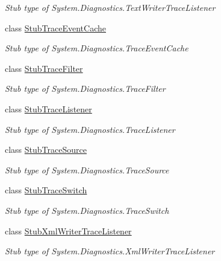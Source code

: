 \begin{DoxyCompactItemize}
\begin{DoxyCompactList}\small\item\em Stub type of System.\-Diagnostics.\-Text\-Writer\-Trace\-Listener\end{DoxyCompactList}\item 
class \hyperlink{class_system_1_1_diagnostics_1_1_fakes_1_1_stub_trace_event_cache}{Stub\-Trace\-Event\-Cache}
\begin{DoxyCompactList}\small\item\em Stub type of System.\-Diagnostics.\-Trace\-Event\-Cache\end{DoxyCompactList}\item 
class \hyperlink{class_system_1_1_diagnostics_1_1_fakes_1_1_stub_trace_filter}{Stub\-Trace\-Filter}
\begin{DoxyCompactList}\small\item\em Stub type of System.\-Diagnostics.\-Trace\-Filter\end{DoxyCompactList}\item 
class \hyperlink{class_system_1_1_diagnostics_1_1_fakes_1_1_stub_trace_listener}{Stub\-Trace\-Listener}
\begin{DoxyCompactList}\small\item\em Stub type of System.\-Diagnostics.\-Trace\-Listener\end{DoxyCompactList}\item 
class \hyperlink{class_system_1_1_diagnostics_1_1_fakes_1_1_stub_trace_source}{Stub\-Trace\-Source}
\begin{DoxyCompactList}\small\item\em Stub type of System.\-Diagnostics.\-Trace\-Source\end{DoxyCompactList}\item 
class \hyperlink{class_system_1_1_diagnostics_1_1_fakes_1_1_stub_trace_switch}{Stub\-Trace\-Switch}
\begin{DoxyCompactList}\small\item\em Stub type of System.\-Diagnostics.\-Trace\-Switch\end{DoxyCompactList}\item 
class \hyperlink{class_system_1_1_diagnostics_1_1_fakes_1_1_stub_xml_writer_trace_listener}{Stub\-Xml\-Writer\-Trace\-Listener}
\begin{DoxyCompactList}\small\item\em Stub type of System.\-Diagnostics.\-Xml\-Writer\-Trace\-Listener\end{DoxyCompactList}\end{DoxyCompactItemize}

